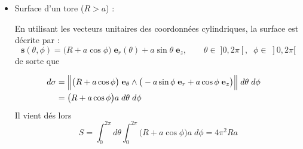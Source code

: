 \documentclass[a4paper]{article}
\begin{document}
\begin{itemize}
\item Surface d'un tore ($ R > a $) : 

\begin{center}
\end{center}

En utilisant les vecteurs unitaires des coordonnées cylindriques, la surface est décrite par : 
\[ \textbf{s}(\theta, \phi) = \big( R + a \cos \phi \big) \; \textbf{e}_r(\theta) + a \sin \theta \; \textbf{e}_z, \qquad \theta \in \; ]0, 2 \pi[, \; \; \phi \in \; ]0, 2 \pi[ \]
de sorte que 

\begin{align*}
d \sigma &= \Big\| \big( R + a \cos \phi \big) \; \textbf{e}_\theta \wedge \big( - a \sin \phi \; \textbf{e}_r + a \cos \phi \; \textbf{e}_z \big) \Big\| \; d \theta \; d \phi \cr
&= \big( R + a \cos \phi \big) a \; d \theta \; d \phi
\end{align*}
Il vient dés lors 
\[ S = \int_0^{2 \pi} d \theta \int_0^{2 \pi} \big( R + a \cos \phi \big) a \; d \phi = 4 \pi^2 R a \]






\end{itemize}
\end{document}
